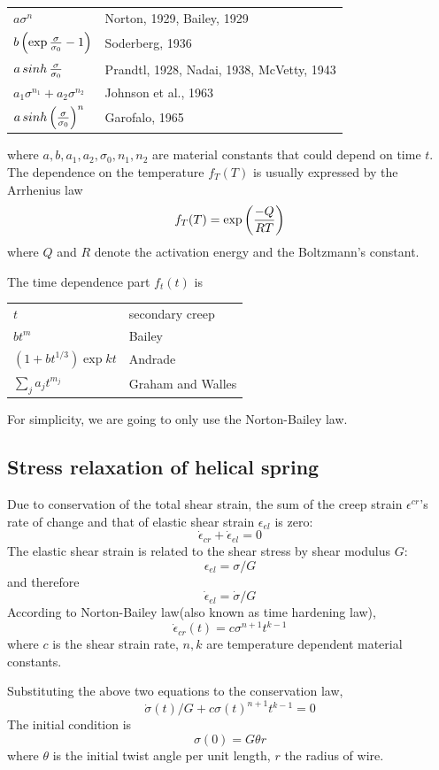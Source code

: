 \documentclass[10pt]{article}
\begin{document}
\begin{tabular}{ll}
$a\sigma^n$ & Norton, 1929, Bailey, 1929 \\
$b\left( \exp{\sigma\over \sigma_0} -1 \right)$ & Soderberg, 1936 \\
$a\mathop{sinh}{\sigma\over \sigma_0}$ & Prandtl, 1928, Nadai, 1938, McVetty, 1943\\
$a_1\sigma^{n_1} + a_2 \sigma^{n_2}$ & Johnson et al., 1963 \\
$a\mathop{sinh} \left( {\sigma\over \sigma_0}\right)^n$ & Garofalo, 1965
\end{tabular}

where $a,b,a_1,a_2,\sigma_0,n_1,n_2$ are material constants that could depend on time $t$. The dependence on the temperature $f_T(T)$ is usually expressed by the Arrhenius law
\[
f_T(T) = \exp \left( {-Q\over RT}\right)
\]
where $Q$ and $R$ denote the activation energy and the Boltzmann's constant.

The time dependence part $f_t(t)$ is

\begin{tabular}{ll}
$t$ & secondary creep \\
$bt^m$ & Bailey \\
$(1+bt^{1/3})\exp{kt}$ & Andrade\\
$\sum_j a_j t^{m_j}$ & Graham and Walles
\end{tabular}

For simplicity, we are going to only use the Norton-Bailey law.
\subsection{Stress relaxation of helical spring}
Due to conservation of the total shear strain, the sum of the creep strain $\epsilon^{cr}$'s rate of change and that of elastic shear strain $\epsilon_{el}$ is zero:
\[
\dot{\epsilon}_{cr} + \dot{\epsilon}_{el} = 0
\]
The elastic shear strain is related to the shear stress by shear modulus $G$:
\[
\epsilon_{el} = \sigma/G
\]
and therefore
\[
\dot{\epsilon}_{el} = \dot{\sigma}/G
\]
According to Norton-Bailey law(also known as time hardening law),
\begin{equation} \label{eq:N-B}
\dot{\epsilon}_{cr}(t)=c\sigma^{n+1} t^{k-1}
\end{equation}
where $c$ is the shear strain rate, $n,k$ are temperature dependent material constants.

Substituting the above two equations to the conservation law,
\begin{equation} \label{eq:diff}
\dot{\sigma}(t)/G+c\sigma(t)^{n+1} t^{k-1}=0
\end{equation}
The initial condition is
\[
\sigma (0) = G\theta r
\]
where $\theta$ is the initial twist angle per unit length, $r$ the radius of wire.
\end{document}
